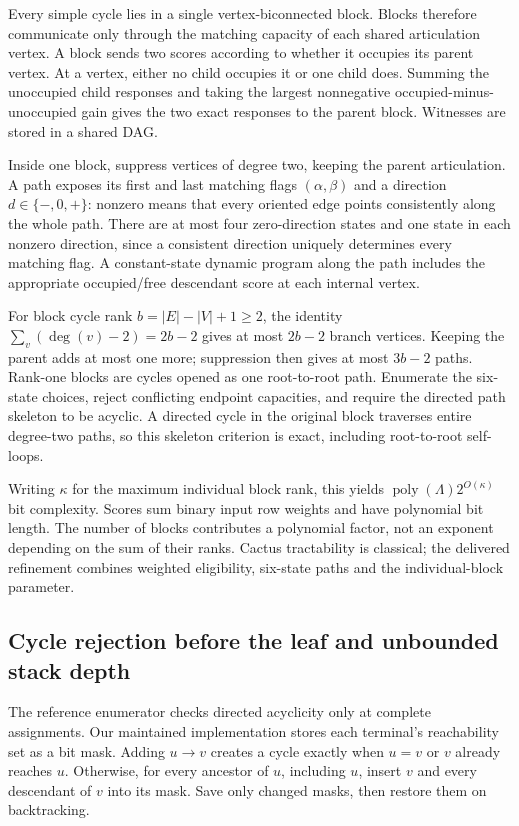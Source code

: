 Every simple cycle lies in a single vertex-biconnected block.  Blocks
therefore communicate only through the matching capacity of each shared
articulation vertex.  A block sends two scores according to whether it
occupies its parent vertex.  At a vertex, either no child occupies it or
one child does.  Summing the unoccupied child responses and taking the
largest nonnegative occupied-minus-unoccupied gain gives the two exact
responses to the parent block.  Witnesses are stored in a shared DAG.

Inside one block, suppress vertices of degree two, keeping the parent
articulation.  A path exposes its first and last matching flags
$(\alpha,\beta)$ and a direction $d\in\{-,0,+\}$: nonzero means that
every oriented edge points consistently along the whole path.  There
are at most four zero-direction states and one state in each nonzero
direction, since a consistent direction uniquely determines every
matching flag.  A constant-state dynamic program along the path includes
the appropriate occupied/free descendant score at each internal vertex.

For block cycle rank $b=|E|-|V|+1\ge2$, the identity
$\sum_v(\deg(v)-2)=2b-2$ gives at most $2b-2$ branch vertices.  Keeping
the parent adds at most one more; suppression then gives at most $3b-2$
paths.  Rank-one blocks are cycles opened as one root-to-root path.
Enumerate the six-state choices, reject conflicting endpoint capacities,
and require the directed path skeleton to be acyclic.  A directed cycle
in the original block traverses entire degree-two paths, so this skeleton
criterion is exact, including root-to-root self-loops.

Writing $\kappa$ for the maximum individual block rank, this yields
$\operatorname{poly}(\Lambda)2^{O(\kappa)}$ bit complexity.  Scores sum
binary input row weights and have polynomial bit length.  The number of
blocks contributes a polynomial factor, not an exponent depending on
the sum of their ranks.  Cactus tractability is classical; the delivered
refinement combines weighted eligibility, six-state paths and the
individual-block parameter.

\subsection{Cycle rejection before the leaf and unbounded stack depth}

The reference enumerator checks directed acyclicity only at complete
assignments.  Our maintained implementation stores each terminal's
reachability set as a bit mask.  Adding $u\to v$ creates a cycle exactly
when $u=v$ or $v$ already reaches $u$.  Otherwise, for every ancestor of
$u$, including $u$, insert $v$ and every descendant of $v$ into its mask.
Save only changed masks, then restore them on backtracking.

